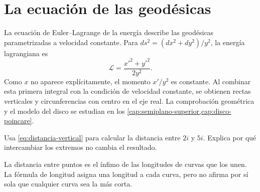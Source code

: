 \section{La ecuación de las geodésicas}

La ecuación de Euler--Lagrange de la energía describe las geodésicas parametrizadas a velocidad constante. Para \(ds^2=(dx^2+dy^2)/y^2\), la energía lagrangiana es
\[
  \mathcal L=\frac{x'^2+y'^2}{2y^2}.
\]
Como \(x\) no aparece explícitamente, el momento \(x'/y^2\) es constante. Al combinar esta primera integral con la condición de velocidad constante, se obtienen rectas verticales y circunferencias con centro en el eje real. La comprobación geométrica y el modelo del disco se estudian en los \cref{cap:semiplano-superior,cap:disco-poincare}.

\begin{problem}
Usa \cref{eq:distancia-vertical} para calcular la distancia entre \(2i\) y \(5i\). Explica por qué intercambiar los extremos no cambia el resultado.
\end{problem}

\begin{remark}
La distancia entre puntos es el ínfimo de las longitudes de curvas que los unen. La fórmula de longitud asigna una longitud a cada curva, pero no afirma por sí sola que cualquier curva sea la más corta.
\end{remark}
